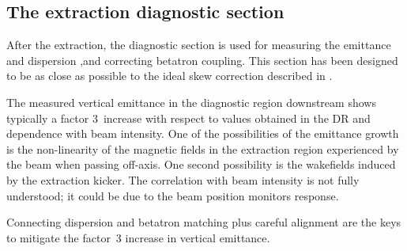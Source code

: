 \subsection{The extraction diagnostic section}
After the extraction, the diagnostic section is used for measuring the emittance and dispersion ,and correcting betatron coupling. This section has been designed to be as close as possible to the ideal skew correction described in \cite{Woodley:453645}.\par
The measured vertical emittance in the diagnostic region downstream shows typically a factor 3~increase with respect to values obtained in the DR and dependence with beam intensity. One of the possibilities of the emittance growth is the non-linearity of the magnetic fields in the extraction region experienced by the beam when passing off-axis. One second possibility is the wakefields induced by the extraction kicker. The correlation with beam intensity is not fully understood; it could be due to the beam position monitors response.\par
Connecting dispersion and betatron matching plus careful alignment are the keys to mitigate the factor~3 increase in vertical emittance.\par
